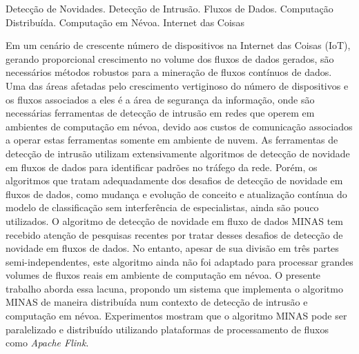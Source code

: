 \documentclass[dissertmst]{ufscar}
\begin{document}
\begin{resumo}{Detecção de Novidades. Detecção de Intrusão. Fluxos de Dados.
   Computação Distribuída. Computação em Névoa. Internet das Coisas}

   Em um cenário de crescente número de dispositivos na Internet das Coisas
   (IoT), gerando proporcional crescimento no volume dos fluxos de dados
   gerados, são necessários métodos robustos para a mineração de fluxos
   contínuos de dados.
   Uma das áreas afetadas pelo crescimento vertiginoso do número de dispositivos
   e os fluxos associados a eles é a área de segurança da informação, onde são
   necessárias ferramentas de detecção de intrusão em redes que operem em
   ambientes de computação em névoa, devido aos custos de comunicação associados
   a operar estas ferramentas somente em ambiente de nuvem.
   As ferramentas de detecção de intrusão utilizam extensivamente algoritmos de
   detecção de novidade em fluxos de dados para identificar padrões no tráfego
   da rede.
   Porém, os algoritmos que tratam adequadamente dos desafios de detecção de
   novidade em fluxos de dados, como mudança e evolução de conceito e
   atualização contínua do modelo de classificação sem interferência de
   especialistas, ainda são pouco utilizados.
   O algoritmo de detecção de novidade em fluxo de dados MINAS tem recebido
   atenção de pesquisas recentes por tratar desses desafios de detecção de
   novidade em fluxos de dados.
   No entanto, apesar de sua divisão em três partes semi-independentes, este
   algoritmo ainda não foi adaptado para processar grandes volumes de fluxos
   reais em ambiente de computação em névoa.
   O presente trabalho aborda essa lacuna, propondo um sistema
   que implementa o algoritmo MINAS de maneira distribuída num contexto
   de detecção de intrusão e computação em névoa.
   Experimentos mostram que o algoritmo MINAS pode ser paralelizado e
   distribuído utilizando plataformas de processamento de fluxos como
   \emph{Apache Flink}.
\end{resumo}
\end{document}
